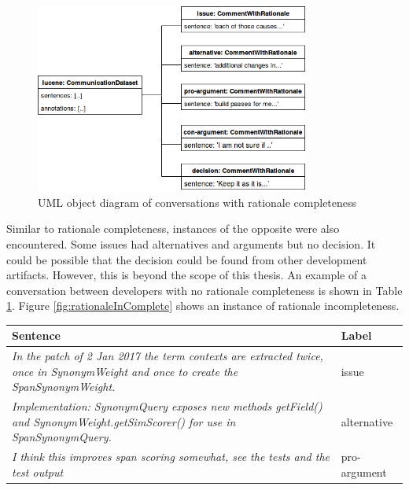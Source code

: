 \documentclass[a4paper,12pt,twoside]{report}
\begin{document}
\begin{figure}[h] %
    \centering
    \includegraphics[width=9cm]{rationale-complete}
    \caption{UML object diagram of conversations with rationale completeness}
    \label{fig:rationaleComplete}
\end{figure}
\noindent \newline
Similar to rationale completeness, instances of the opposite were also encountered. Some issues had alternatives and arguments but no decision. It could be possible that the decision could be found from other development artifacts. However, this is beyond the scope of this thesis. An example of a conversation between developers with no rationale completeness is shown in Table \ref{tab:incompleterationaleExample}. Figure \ref{fig:rationaleInComplete} shows an instance of rationale incompleteness. 
\begin{table} [!htbp]%
    \centering
    \begin{adjustbox}{max width=\columnwidth}
    \def\arraystretch{1} %
    \begin{tabular}{p{12cm} p{3cm}}
        \toprule
        \textbf{Sentence} & \textbf{Label}\\
        \midrule
			\textit{In the patch of 2 Jan 2017 the term contexts are extracted twice, once in SynonymWeight and once to create the SpanSynonymWeight.} & issue\\
			\midrule
			\textit{Implementation: SynonymQuery exposes new methods getField() and SynonymWeight.getSimScorer() for use in SpanSynonymQuery.} & alternative \\ 
			\midrule
			\textit{I think this improves span scoring somewhat, see the tests and the test output} & pro-argument \\ 
        \midrule
    \end{tabular}
    \end{adjustbox}
    \label{tab:incompleterationaleExample}
\end{table}
\end{document}
